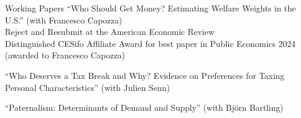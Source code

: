 \documentclass{resume} %
\begin{document}
\begin{rSection}{Working Papers}
  ``Who Should Get Money? Estimating Welfare Weights in the U.S.'' (with Francesco Capozza) \\ \vspace{0.1em}
  { \normalsize  \hspace*{0.9em} Reject and Resubmit at the American Economic Review }\\\vspace{0.1em}
  { \normalsize  \hspace*{0.8em} Distinguished CESifo Affiliate Award for best paper in Public Economics 2024 (awarded \hspace*{1.3em} to Francesco Capozza)} 

  ``Who Deserves a Tax Break and Why? Evidence on
  Preferences for Taxing Personal Characteristics'' (with Julien Senn)

  ``Paternalism: Determinants of Demand and Supply'' (with Bj\"{o}rn Bartling)

  \end{rSection}




\end{document}
